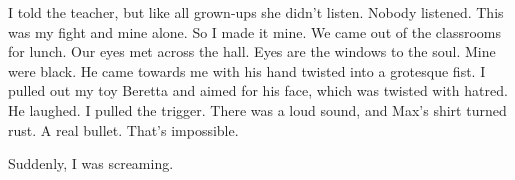 I told the teacher, but like all grown-ups she didn't listen.
Nobody listened. This was my fight and mine alone. So I made it
mine. We came out of the classrooms for lunch. Our eyes met across
the hall. Eyes are the windows to the soul. Mine were black. He
came towards me with his hand twisted into a grotesque fist. I
pulled out my toy Beretta and aimed for his face, which was twisted
with hatred. He laughed. I pulled the trigger. There was a loud
sound, and Max's shirt turned rust. A real bullet.
That's impossible.



Suddenly, I was screaming. 
 






